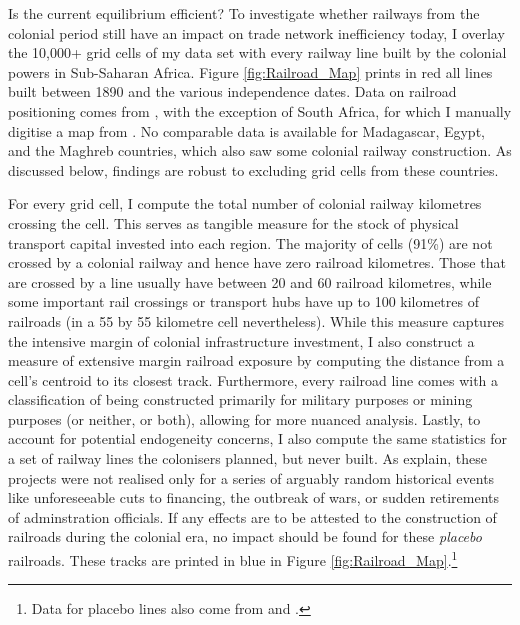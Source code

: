 \documentclass[11pt, oneside]{article}   	%
\begin{document}
Is the current equilibrium efficient? To investigate whether railways from the colonial period still have an impact on trade network inefficiency today, I overlay the 10,000+ grid cells of my data set with every railway line built by the colonial powers in Sub-Saharan Africa. Figure \eqref{fig:Railroad_Map} prints in red all lines built between 1890 and the various independence dates. Data on railroad positioning comes from \cite{jedwab_permanent_2016}, with the exception of South Africa, for which I manually digitise a map from \cite{Herranz-Loncan_publicbenefitRailways_2017}. No comparable data is available for Madagascar, Egypt, and the Maghreb countries, which also saw some colonial railway construction. As discussed below, findings are robust to excluding grid cells from these countries.

For every grid cell, I compute the total number of colonial railway kilometres crossing the cell. This serves as tangible measure for the stock of physical transport capital invested into each region. The majority of cells (91\%) are not crossed by a colonial railway and hence have zero railroad kilometres. Those that are crossed by a line usually have between 20 and 60 railroad kilometres, while some important rail crossings or transport hubs have up to 100 kilometres of railroads (in a 55 by 55 kilometre cell nevertheless). While this measure captures the intensive margin of colonial infrastructure investment, I also construct a measure of extensive margin railroad exposure by computing the distance from a cell's centroid to its closest track. Furthermore, every railroad line comes with a classification of being constructed primarily for military purposes or mining purposes (or neither, or both), allowing for more nuanced analysis. Lastly, to account for potential endogeneity concerns, I also compute the same statistics for a set of railway lines the colonisers planned, but never built. As \cite{jedwab_permanent_2016} explain, these projects were not realised only for a series of arguably random historical events like unforeseeable cuts to financing, the outbreak of wars, or sudden retirements of adminstration officials. If any effects are to be attested to the construction of railroads during the colonial era, no impact should be found for these \emph{placebo} railroads. These tracks are printed in blue in Figure \eqref{fig:Railroad_Map}.\footnote{Data for placebo lines also come from \cite{jedwab_permanent_2016} and \cite{Herranz-Loncan_publicbenefitRailways_2017}.}
\end{document}
